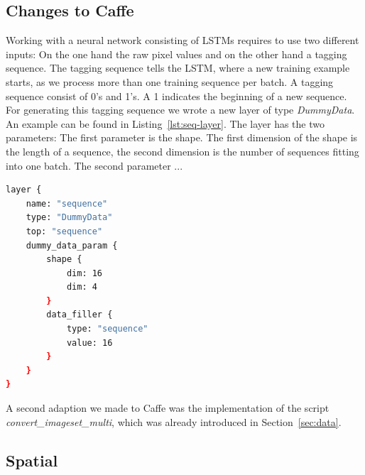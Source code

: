 \subsection{Changes to Caffe}

Working with a neural network consisting of LSTMs requires to use two different inputs:
On the one hand the raw pixel values and on the other hand a tagging sequence.
The tagging sequence tells the LSTM, where a new training example starts, as we process more than one training sequence per batch.
A tagging sequence consist of 0's and 1's.
A 1 indicates the beginning of a new sequence.
For generating this tagging sequence we wrote a new layer of type \emph{DummyData}.
An example can be found in Listing~\ref{lst:seq-layer}.
The layer has the two parameters:
The first parameter is the shape.
The first dimension of the shape is the length of a sequence, the second dimension is the number of sequences fitting into one batch.
The second parameter ...

\begin{lstlisting}[language=sh, caption=Sequence Layer, label=lst:seq-layer]
layer {
	name: "sequence"
	type: "DummyData"
	top: "sequence"
	dummy_data_param {
		shape {
			dim: 16
			dim: 4
		}
		data_filler {
			type: "sequence"
			value: 16
		}
	}
}
\end{lstlisting}

A second adaption we made to Caffe was the implementation of the script \emph{convert\_imageset\_multi}, which was already introduced in Section~\ref{sec:data}.


\subsection{Spatial}
\label{subsec:spatial}

